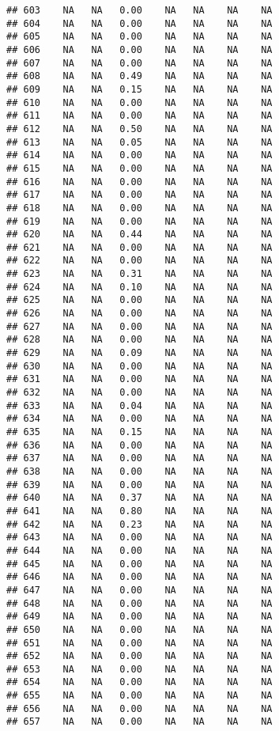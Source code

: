 \documentclass{article}\usepackage{graphicx, color}
\makeatletter
\newenvironment{kframe}{%
 \def\at@end@of@kframe{}%
 \ifinner\ifhmode%
  \def\at@end@of@kframe{\end{minipage}}%
  \begin{minipage}{\columnwidth}%
 \fi\fi%
 \def\FrameCommand##1{\hskip\@totalleftmargin \hskip-\fboxsep
 \colorbox{shadecolor}{##1}\hskip-\fboxsep
     \hskip-\linewidth \hskip-\@totalleftmargin \hskip\columnwidth}%
 \MakeFramed {\advance\hsize-\width
   \@totalleftmargin\z@ \linewidth\hsize
   \@setminipage}}%
 {\par\unskip\endMakeFramed%
 \at@end@of@kframe}
\newenvironment{knitrout}{}{} %
\makeatother
\begin{document}
\begin{knitrout}
\begin{kframe}
\begin{verbatim}
## 603    NA   NA   0.00    NA   NA    NA    NA
## 604    NA   NA   0.00    NA   NA    NA    NA
## 605    NA   NA   0.00    NA   NA    NA    NA
## 606    NA   NA   0.00    NA   NA    NA    NA
## 607    NA   NA   0.00    NA   NA    NA    NA
## 608    NA   NA   0.49    NA   NA    NA    NA
## 609    NA   NA   0.15    NA   NA    NA    NA
## 610    NA   NA   0.00    NA   NA    NA    NA
## 611    NA   NA   0.00    NA   NA    NA    NA
## 612    NA   NA   0.50    NA   NA    NA    NA
## 613    NA   NA   0.05    NA   NA    NA    NA
## 614    NA   NA   0.00    NA   NA    NA    NA
## 615    NA   NA   0.00    NA   NA    NA    NA
## 616    NA   NA   0.00    NA   NA    NA    NA
## 617    NA   NA   0.00    NA   NA    NA    NA
## 618    NA   NA   0.00    NA   NA    NA    NA
## 619    NA   NA   0.00    NA   NA    NA    NA
## 620    NA   NA   0.44    NA   NA    NA    NA
## 621    NA   NA   0.00    NA   NA    NA    NA
## 622    NA   NA   0.00    NA   NA    NA    NA
## 623    NA   NA   0.31    NA   NA    NA    NA
## 624    NA   NA   0.10    NA   NA    NA    NA
## 625    NA   NA   0.00    NA   NA    NA    NA
## 626    NA   NA   0.00    NA   NA    NA    NA
## 627    NA   NA   0.00    NA   NA    NA    NA
## 628    NA   NA   0.00    NA   NA    NA    NA
## 629    NA   NA   0.09    NA   NA    NA    NA
## 630    NA   NA   0.00    NA   NA    NA    NA
## 631    NA   NA   0.00    NA   NA    NA    NA
## 632    NA   NA   0.00    NA   NA    NA    NA
## 633    NA   NA   0.04    NA   NA    NA    NA
## 634    NA   NA   0.00    NA   NA    NA    NA
## 635    NA   NA   0.15    NA   NA    NA    NA
## 636    NA   NA   0.00    NA   NA    NA    NA
## 637    NA   NA   0.00    NA   NA    NA    NA
## 638    NA   NA   0.00    NA   NA    NA    NA
## 639    NA   NA   0.00    NA   NA    NA    NA
## 640    NA   NA   0.37    NA   NA    NA    NA
## 641    NA   NA   0.80    NA   NA    NA    NA
## 642    NA   NA   0.23    NA   NA    NA    NA
## 643    NA   NA   0.00    NA   NA    NA    NA
## 644    NA   NA   0.00    NA   NA    NA    NA
## 645    NA   NA   0.00    NA   NA    NA    NA
## 646    NA   NA   0.00    NA   NA    NA    NA
## 647    NA   NA   0.00    NA   NA    NA    NA
## 648    NA   NA   0.00    NA   NA    NA    NA
## 649    NA   NA   0.00    NA   NA    NA    NA
## 650    NA   NA   0.00    NA   NA    NA    NA
## 651    NA   NA   0.00    NA   NA    NA    NA
## 652    NA   NA   0.00    NA   NA    NA    NA
## 653    NA   NA   0.00    NA   NA    NA    NA
## 654    NA   NA   0.00    NA   NA    NA    NA
## 655    NA   NA   0.00    NA   NA    NA    NA
## 656    NA   NA   0.00    NA   NA    NA    NA
## 657    NA   NA   0.00    NA   NA    NA    NA

\end{verbatim}
\end{kframe}
\end{knitrout}
\end{document}
